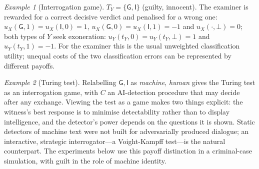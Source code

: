 \documentclass[10pt,a4paper]{article}
\theoremstyle{remark}
\newtheorem{example}{Example}
\newcommand{\Cont}{\bot}
\newcommand{\G}{\mathsf{G}}
\newcommand{\I}{\mathsf{I}}
\begin{document}
\begin{example}[Interrogation game]\label{ex:interrog}
$T_Y=\{\G,\I\}$ (guilty, innocent). The examiner is rewarded for a correct decisive verdict and penalised for a wrong one:
$u_X(\G,1)=u_X(\I,0)=1$, $u_X(\G,0)=u_X(\I,1)=-1$ and $u_X(\cdot,\Cont)=0$; both types of $Y$ seek exoneration:
$u_Y(t_Y,0)=u_Y(t_Y,\Cont)=1$ and $u_Y(t_Y,1)=-1$. For the examiner this is the usual unweighted classification
utility; unequal costs of the two classification errors can be represented by different payoffs.
\end{example}

\begin{example}[Turing test]\label{ex:turing}
Relabelling $\G,\I$ as \emph{machine}, \emph{human} gives the Turing test as an interrogation game, with $C$ an
AI-detection procedure that may decide after any exchange. Viewing the test as a game makes two things explicit: the
witness's best response is to minimise detectability rather than to display intelligence, and the detector's power
depends on the questions it is shown. Static detectors of machine text \citep{mitchell2023,mireshghallah2024} were not
built for adversarially produced dialogue; an interactive, strategic interrogator---a Voight-Kampff test---is the
natural counterpart. The experiments below use this payoff distinction in a criminal-case simulation, with guilt
in the role of machine identity.
\end{example}


\end{document}
